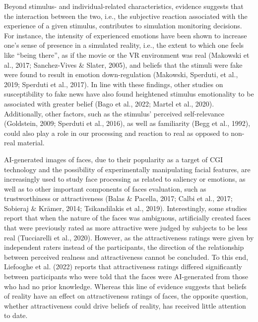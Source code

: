 \documentclass[
  man,floatsintext]{apa6}
\begin{document}
Beyond stimulus- and individual-related characteristics, evidence suggests that the interaction between the two, i.e., the subjective reaction associated with the experience of a given stimulus, contributes to simulation monitoring decisions. For instance, the intensity of experienced emotions have been shown to increase one's sense of presence in a simulated reality, i.e., the extent to which one feels like ``being there'', as if the movie or the VR environment was real (Makowski et al., 2017; Sanchez-Vives \& Slater, 2005), and beliefs that the stimuli were fake were found to result in emotion down-regulation (Makowski, Sperduti, et al., 2019; Sperduti et al., 2017). In line with these findings, other studies on susceptibility to fake news have also found heightened stimulus emotionality to be associated with greater belief (Bago et al., 2022; Martel et al., 2020). Additionally, other factors, such as the stimulus' perceived self-relevance (Goldstein, 2009; Sperduti et al., 2016), as well as familiarity (Begg et al., 1992), could also play a role in our processing and reaction to real as opposed to non-real material.

AI-generated images of faces, due to their popularity as a target of CGI technology and the possibility of experimentally manipulating facial features, are increasingly used to study face processing as related to saliency or emotions, as well as to other important components of faces evaluation, such as trustworthiness or attractiveness (Balas \& Pacella, 2017; Calbi et al., 2017; Sobieraj \& Krämer, 2014; Tsikandilakis et al., 2019). Interestingly, some studies report that when the nature of the faces was ambiguous, artificially created faces that were previously rated as more attractive were judged by subjects to be less real (Tucciarelli et al., 2020). However, as the attractiveness ratings were given by independent raters instead of the participants, the direction of the relationship between perceived realness and attractiveness cannot be concluded. To this end, Liefooghe et al. (2022) reports that attractiveness ratings differed significantly between participants who were told that the faces were AI-generated from those who had no prior knowledge. Whereas this line of evidence suggests that beliefs of reality have an effect on attractiveness ratings of faces, the opposite question, whether attractiveness could drive beliefs of reality, has received little attention to date.
\end{document}
